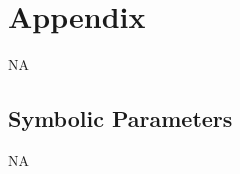 \documentclass[12pt, titlepage]{article}
\begin{document}
\begin{enumerate}
\begin{table} [H]
\begin{tabular}{|c|p{5cm}|}
	\end{tabular}\\
\end{table}











\newpage

\section{Appendix}

NA

\subsection{Symbolic Parameters}

NA


\end{enumerate}
\end{document}
